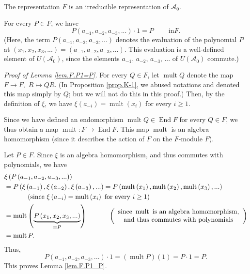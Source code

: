 \documentclass[etingof-lie.tex]{subfiles}
\begin{document}
\begin{proposition}
\label{prop.F.irrep}The representation $F$ is an irreducible representation of
$\mathcal{A}_{0}$.
\end{proposition}

\begin{lemma}
\label{lem.F.P1=P}For every $P\in F$, we have
\[
P\left(  a_{-1},a_{-2},a_{-3},...\right)  \cdot1=P\ \ \ \ \ \ \ \ \ \ \text{in
}F.
\]
(Here, the term $P\left(  a_{-1},a_{-2},a_{-3},...\right)  $ denotes the
evaluation of the polynomial $P$ at $\left(  x_{1},x_{2},x_{3},...\right)
=\left(  a_{-1},a_{-2},a_{-3},...\right)  $. This evaluation is a well-defined
element of $U\left(  \mathcal{A}_{0}\right)  $, since the elements $a_{-1}$,
$a_{-2}$, $a_{-3}$, $...$ of $U\left(  \mathcal{A}_{0}\right)  $ commute.)
\end{lemma}

\textit{Proof of Lemma \ref{lem.F.P1=P}.} For every $Q\in F$, let
$\operatorname*{mult}Q$ denote the map $F\rightarrow F,$ $R\mapsto QR$. (In
Proposition \ref{prop.K-1}, we abused notations and denoted this map simply by
$Q$; but we will not do this in this proof.) Then, by the definition of $\xi$,
we have $\xi\left(  a_{-i}\right)  =\operatorname*{mult}\left(  x_{i}\right)
$ for every $i\geq1$.

Since we have defined an endomorphism $\operatorname*{mult}Q\in
\operatorname*{End}F$ for every $Q\in F$, we thus obtain a map
$\operatorname*{mult}:F\rightarrow\operatorname*{End}F$. This map
$\operatorname*{mult}$ is an algebra homomorphism (since it describes the
action of $F$ on the $F$-module $F$).

Let $P\in F$. Since $\xi$ is an algebra homomorphism, and thus commutes with
polynomials, we have
\begin{align*}
&  \xi\left(  P\left(  a_{-1},a_{-2},a_{-3},...\right)  \right) \\
&  =P\left(  \xi\left(  a_{-1}\right)  ,\xi\left(  a_{-2}\right)  ,\xi\left(
a_{-3}\right)  ,...\right)  =P\left(  \operatorname*{mult}\left(
x_{1}\right)  ,\operatorname*{mult}\left(  x_{2}\right)  ,\operatorname*{mult}%
\left(  x_{3}\right)  ,...\right) \\
&  \ \ \ \ \ \ \ \ \ \ \left(  \text{since }\xi\left(  a_{-i}\right)
=\operatorname*{mult}\left(  x_{i}\right)  \text{ for every }i\geq1\right) \\
&  =\operatorname*{mult}\left(  \underbrace{P\left(  x_{1},x_{2}%
,x_{3},...\right)  }_{=P}\right)  \ \ \ \ \ \ \ \ \ \ \left(
\begin{array}
[c]{c}%
\text{since }\operatorname*{mult}\text{ is an algebra homomorphism,}\\
\text{and thus commutes with polynomials}%
\end{array}
\right) \\
&  =\operatorname*{mult}P.
\end{align*}
Thus,%
\[
P\left(  a_{-1},a_{-2},a_{-3},...\right)  \cdot1=\left(  \operatorname*{mult}%
P\right)  \left(  1\right)  =P\cdot1=P.
\]
This proves Lemma \ref{lem.F.P1=P}.
\end{document}
